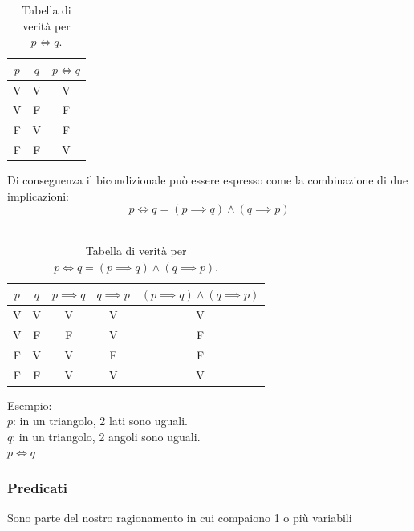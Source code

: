     
    
        \begin{table}[h!]
            \centering
            \begin{tabular}{|c|c|c|}
                \hline
                $p$ & $q$ & $p \iff q$ \\
                \hline
                V & V & V \\
                V & F & F \\
                F & V & F \\
                F & F & V \\
                \hline
            \end{tabular}
            \caption{Tabella di verità per $p \iff q$.}
        \end{table}
    
        Di conseguenza il bicondizionale può essere espresso come la combinazione di due implicazioni: \\
        \[p \iff q = (p \implies q)\land(q \implies p)\]    \\
        
        \begin{table}[h!]
            \centering
            \begin{tabular}{|c|c|c|c|c|}
            \hline
            $p$ & $q$ & $p \implies q$ & $q \implies p$ & $(p \implies q) \land (q \implies p)$ \\
                \hline
                V & V & V & V & V \\
                V & F & F & V & F \\
                F & V & V & F & F \\
                F & F & V & V & V \\
                \hline
            \end{tabular}
            \caption{Tabella di verità per $p \iff q = (p \implies q) \land (q \implies p)$.}
        \end{table}
    
        
        \underline{Esempio:} \\
        $p$: in un triangolo, 2 lati sono uguali.     \\
        $q$: in un triangolo, 2 angoli sono uguali.   \\
        \(p \iff q\)

    \newpage

    \subsubsection{Predicati}
        Sono parte del nostro ragionamento in cui compaiono 1 o più variabili

